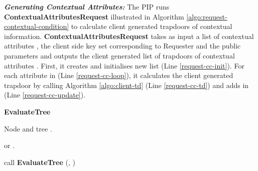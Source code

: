 \documentclass[final,5p,times,twocolumn]{elsarticle}
\newcommand{\algofontsize}{\fontsize{7}{8}\selectfont}
\begin{document}
\emph{\textbf{Generating Contextual Attributes:}} 
The PIP runs \textbf{ContextualAttributesRequest} illustrated in Algorithm \ref{algo:request-contextual-condition} to calculate client generated trapdoors of contextual information. \textbf{ContextualAttributesRequest} takes as input a list of contextual attributes , the client side key set  corresponding to Requester  and the public parameters  and outputs the client generated list of trapdoors of contextual attributes . First, it creates and initialises new list  (Line \ref{request-cc-init}). For each attribute  in  (Line \ref{request-cc-loop}), it calculates the client generated trapdoor  by calling Algorithm \ref{algo:client-td} (Line \ref{request-cc-td}) and adds  in  (Line \ref{request-cc-update}).




\begin{algorithm}[htp]

{\algofontsize
\caption{\textbf{EvaluateTree}}

\label{algo:evaluate-tree}

\begin{algorithmic}[1]

\REQUIRE Node  and tree .

\ENSURE  or .

\medskip

\IF {} \label{line:evaluate-tree-if-null}
	\RETURN  \label{line:evaluate-tree-decision-not-null}
\ENDIF

 \label{line:evaluate-tree-child-loop}
	
	\STATE call \textbf{EvaluateTree} (, ) {\algofontsize {}} \label{line:evaluate-tree-call}
	
\ENDFOR

\STATE  \label{line:evaluate-tree-init-t}

\STATE  \label{line:evaluate-tree-init-m}

 \label{line:evaluate-tree-count-loop}

	\STATE  \label{line:evaluate-tree-inc-t}
	
	\IF {} \label{line:evaluate-tree-find-decision}
		\STATE  \label{line:evaluate-tree-inc-m}
	\ENDIF

\ENDFOR

 \label{line:evaluate-tree-find-gate}
	\STATE  \label{line:evaluate-tree-set-decision-true}
\ELSE
	\STATE  \label{line:evaluate-tree-set-decision-false}
\ENDIF

\RETURN  \label{line:evaluate-tree-return-decision}

\end{algorithmic}

}

\end{algorithm}
\end{document}
